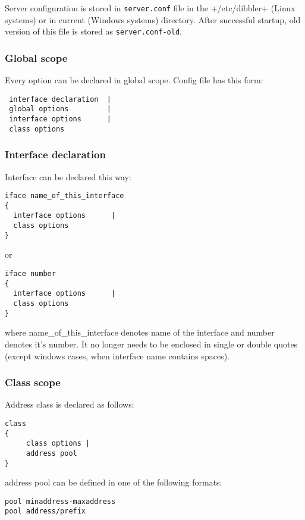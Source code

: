 Server configuration is stored in \verb+server.conf+ file in the
+/etc/dibbler+ (Linux systems) or in current (Windows systems)
directory. After successful startup, old version of this file is stored as
\verb+server.conf-old+.

\subsubsection{Global scope}

Every option can be declared in global scope.
Config file has this form:

\begin{verbatim}
 interface declaration  |
 global options         |
 interface options      |
 class options          
\end{verbatim}

\subsubsection{Interface declaration}

Interface can be declared this way:
\begin{verbatim}
iface name_of_this_interface
{
  interface options      |
  class options        
}
\end{verbatim}

or 

\begin{verbatim}
iface number 
{
  interface options      |
  class options        
}
\end{verbatim}

where name\_of\_this\_interface denotes name of the interface and
number denotes it's number. It no longer needs to be enclosed in
single or double quotes (except windows cases, when interface name
contains spaces).

\subsubsection{Class scope}
Address class is declared as follows:

\begin{verbatim}
class
{  
     class options |
     address pool    
}
\end{verbatim}

address pool can be defined in one of the following formats:
\begin{verbatim}
pool minaddress-maxaddress
pool address/prefix
\end{verbatim}


